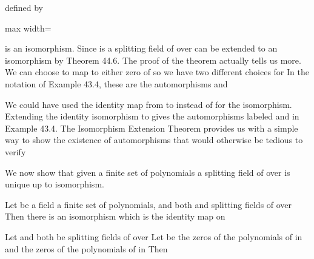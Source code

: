 \documentclass[11pt,oneside]{article}
\begin{document}
\begin{BookBody}
\noindent defined by

\begin{center}\begin{adjustbox}{max width=\linewidth}\end{adjustbox}\end{center}

is an isomorphism. Since  is a splitting field of  over  can be extended to an isomorphism  by Theorem 44.6. The proof of the theorem actually tells us more. We can choose \BookInline{\tau } to map to either zero of  so we have two different choices for  In the notation of Example 43.4, these are the automorphisms \BookInline{\sigma } and 

We could have used the identity map from  to  instead of \BookInline{\sigma } for the isomorphism. Extending the identity isomorphism to  gives the automorphisms labeled \BookInline{\iota } and \BookInline{\tau } in Example 43.4. The Isomorphism Extension Theorem provides us with a simple way to show the existence of automorphisms that would otherwise be tedious to verify\BookEnd{\blacktriangle}


\noindent We now show that given a finite set of polynomials a splitting field of  over  is unique up to isomorphism.

 Let  be a field a finite set of polynomials, and both  and  splitting fields of  over  Then there is an isomorphism  which is the identity map on 

 Let  and  both be splitting fields of  over  Let  be the zeros of the polynomials of  in  and  the zeros of the polynomials of  in  Then


\end{BookBody}
\end{document}
